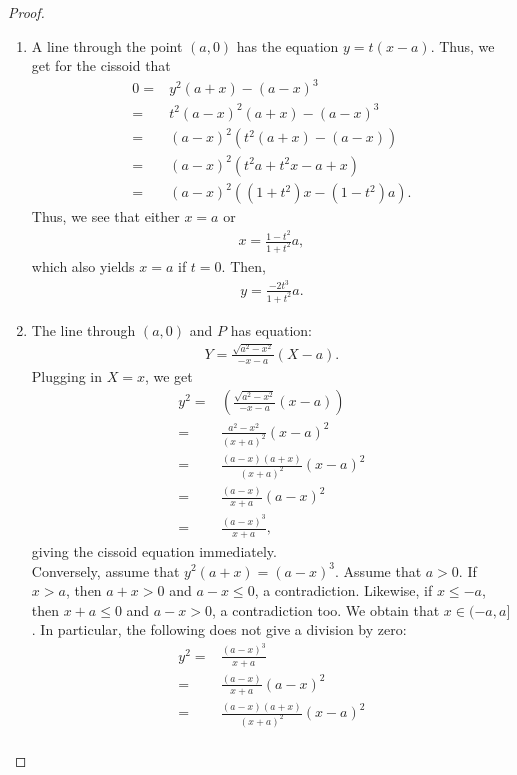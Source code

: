 \begin{proof}
\begin{enumerate}
    \item A line through the point $(a,0)$ has the equation $y = t(x-a)$. 
    Thus, we get for the cissoid that
    \begin{align*}
        0
        =& y^2 (a+x) - (a-x)^3\\
        =& t^2 (a-x)^2 (a+x) - (a-x)^3\\
        =& (a-x)^2 ( t^2 (a+x) - (a-x))\\
        =& (a-x)^2 ( t^2 a + t^2 x - a + x)\\
        =& (a-x)^2 ( (1+t^2)x - (1 - t^2)a).
    \end{align*}
    Thus, we see that either $x=a$ or
    \begin{align*}
        x = \frac{1-t^2}{1+t^2}a,
    \end{align*}
    which also yields $x=a$ if $t=0$. 
    Then,
    \begin{align*}
        y = \frac{-2t^3}{1+t^2}a.
    \end{align*}
    \item The line through $(a,0)$ and $P$ has equation:
    \begin{align*}
        Y = \frac{\sqrt{a^2 - x^2}}{-x-a}(X-a).
    \end{align*}
    Plugging in $X = x$, we get
    \begin{align*}
        y^2
        =& \left(\frac{\sqrt{a^2 - x^2}}{-x-a}(x-a)\right)\\
        =& \frac{a^2 - x^2}{(x+a)^2}(x-a)^2\\
        =& \frac{(a-x)(a+x)}{(x+a)^2}(x-a)^2\\
        =& \frac{(a-x)}{x+a}(a-x)^2\\
        =& \frac{(a-x)^3}{x+a},
    \end{align*}
    giving the cissoid equation immediately.\\
    Conversely, assume that $y^2 (a+x) = (a-x)^3$. 
    Assume that $a>0$. 
    If $x>a$, then $a+x>0$ and $a-x\leq 0$, a contradiction. 
    Likewise, if $x\leq -a$, then $x+a\leq 0$ and $a-x>0$, a contradiction too. 
    We obtain that $x\in (-a,a]$. In particular, the following does not give a division by zero:
    \begin{align*}
        y^2
        =& \frac{(a-x)^3}{x+a}\\
        =& \frac{(a-x)}{x+a}(a-x)^2\\
        =& \frac{(a-x)(a+x)}{(x+a)^2}(x-a)^2\\

\end{align*}
\end{enumerate}
\end{proof}

